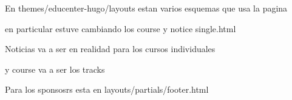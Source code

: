 En themes/educenter-hugo/layouts estan varios esquemas que usa la pagina

en particular estuve cambiando los course y notice single.html


Noticias va a ser en realidad para los cursos individuales

y course va a ser los tracks


Para los sponsosrs esta en layouts/partials/footer.html
